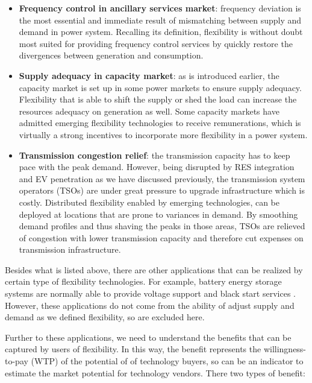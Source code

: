 \begin{itemize}
	\item \textbf{Frequency control in ancillary services market}: frequency deviation is the most essential and immediate result of mismatching between supply and demand in power system. Recalling its definition, flexibility is without doubt most suited for providing frequency control services by quickly restore the divergences between generation and consumption. 
	
	\item \textbf{Supply adequacy in capacity market}: as is introduced earlier, the capacity market is set up in some power markets to ensure supply adequacy. Flexibility that is able to shift the supply or shed the load can increase the resources adequacy on generation as well. Some capacity markets have admitted emerging flexibility technologies to receive remunerations, which is virtually a strong incentives to incorporate more flexibility in a power system.
	
	\item \textbf{Transmission congestion relief}: the transmission capacity has to keep pace with the peak demand. However, being disrupted by RES integration and EV penetration as we have discussed previously, the transmission system operators (TSOs) are under great pressure to upgrade infrastructure which is costly. Distributed flexibility enabled by emerging technologies, can be deployed at locations that are prone to variances in demand. By smoothing demand profiles and thus shaving the peaks in those areas, TSOs are relieved of congestion with lower transmission capacity and therefore cut expenses on transmission infrastructure.
	
\end{itemize}

Besides what is listed above, there are other applications that can be realized by certain type of flexibility technologies. For example, battery energy storage systems are normally able to provide voltage support and black start services \cite{Eyer2010,Rastler2010,Akhil2015}. However, these applications do not come from the ability of adjust supply and demand as we defined flexibility, so are excluded here.

Further to these applications, we need to understand the benefits that can be captured by users of flexibility. In this way, the benefit represents the willingness-to-pay (WTP) of the potential of of technology buyers, so can be an indicator to estimate the market potential for technology vendors. There two types of benefit:

